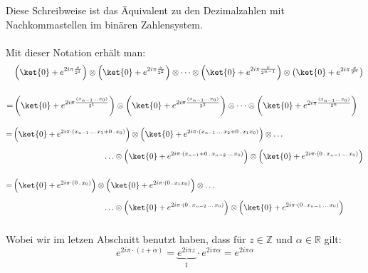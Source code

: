 \noindent Diese Schreibweise ist das Äquivalent zu den Dezimalzahlen mit Nachkommastellen im binären Zahlensystem.
\paragraph{}
Mit dieser Notation erhält man: 
\[\begin{split}
    &\left( \ket{0}+ e^{2i \pi \frac{x}{2^{1} } }\right)\otimes\left( \ket{0}+ e^{2i \pi \frac{x}{2^{2} } }\right)\otimes \dots \otimes\left( \ket{0}+ e^{2i \pi \frac{x}{2^{n-1} } }\right)\otimes\left( \ket{0}+ e^{2i \pi \frac{x}{2^{n} } }\right) \\[0.5cm]
    =&\left( \ket{0}+ e^{2i \pi \frac{(x_{n-1}\ldots x_0)}{2^{1} } }\right)\otimes\left( \ket{0}+ e^{2i \pi \frac{(x_{n-1}\ldots x_0)}{2^{2} } }\right)\otimes \dots \otimes\left( \ket{0}+ e^{2i \pi \frac{(x_{n-1}\ldots x_0)}{2^{n} } }\right) \\
    \end{split}\]
    
    \[\begin{split}
    =&\left( \ket{0}+ e^{2i \pi \cdot (x_{n-1}\,\ldots\, x_1 + 0\,.\,x_0)}\right)\otimes\left( \ket{0}+ e^{2i \pi \cdot (x_{n-1}\,\ldots\, x_{2}+0\,.\,x_{1} x_0) }\right)\otimes \dots \\[0.2cm]
    &\hspace{4cm}\ldots\otimes\left( \ket{0}+ e^{2i \pi \cdot (x_{n-1}+0\,.\,x_{n-2}\,\ldots\, x_0) }\right)\otimes\left( \ket{0}+ e^{2i \pi \cdot (0\,.\,x_{n-1}\,\ldots\, x_0) } \right) \\[0.5cm]
    =&\left( \ket{0}+ e^{2i \pi \cdot (0\,.\,x_0)}\right)\otimes\left( \ket{0}+ e^{2i \pi \cdot (0\,.\,x_{1} x_0) }\right)\otimes \dots \\[0.2cm]
    &\hspace{4cm}\ldots\otimes\left( \ket{0}+ e^{2i \pi \cdot (0\,.\,x_{n-2}\,\ldots\, x_0) }\right)\otimes\left( \ket{0}+ e^{2i \pi \cdot (0\,.\,x_{n-1}\,\ldots\, x_0) } \right) \\[0.3cm]
    \end{split}\]

Wobei wir im letzen Abschnitt benutzt haben, dass für $z \in \mathbb{Z}$ und $\alpha \in \mathbb{R}$ gilt:
\[ e^{2i \pi\cdot (z+\alpha)}= \underbrace{e^{2i \pi z}}_{1}\cdot e^{2i \pi \alpha}=e^{2i \pi \alpha}\]

\paragraph{}

